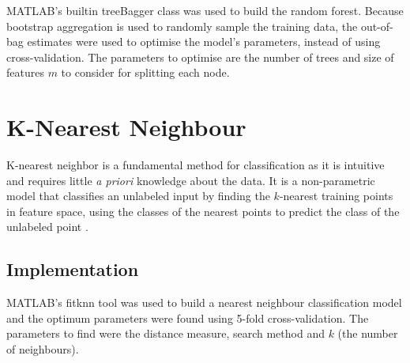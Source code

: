 MATLAB's builtin treeBagger class was used to build the random forest. Because bootstrap aggregation is used to randomly sample the training data, the out-of-bag estimates were used to optimise the model's parameters, instead of using cross-validation. The parameters to optimise are the number of trees and size of features $m$ to consider for splitting each node. 

\section{K-Nearest Neighbour}

K-nearest neighbor is a fundamental method for classification as it is intuitive and requires little \textit{a priori} knowledge about the data. It is a non-parametric model that classifies an unlabeled input by finding the $k$-nearest training points in feature space, using the classes of the nearest points to predict the class of the unlabeled point \cite{Peterson}. 

\subsection{Implementation}

MATLAB's fitknn tool was used to build a nearest neighbour classification model and the optimum parameters were found using 5-fold cross-validation. The parameters to find were the distance measure, search method and $k$ (the number of neighbours). 

